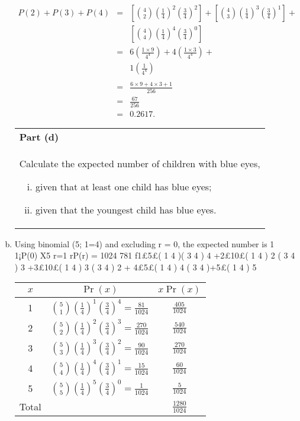 \documentclass[a4paper,12pt]{article}
\begin{document}
\begin{enumerate}[(a)]
\begin{eqnarray*} 
P(2)+P(3)+P(4) &=& 
\left[ { 4 \choose 2}
\left( \frac{1}{4} \right) ^2 \left(\frac{3}{4}\right)^2 \right]+ 
\left[ { 4 \choose 3}
\left( \frac{1}{4} \right) ^3  \left(\frac{3}{4}\right)^1 \right]
+ \\
& & \left[ { 4 \choose 4}
\left( \frac{1}{4} \right) ^4  \left(\frac{3}{4}\right)^{0} \right]
\\ &=& 6 \left(\frac{1 \times 9}{4^4}\right) + 4 \left(\frac{1 \times 3}{4^4}\right)+ \\ & &  1 \left(\frac{1}{4^4}\right)\\
\\ &=&  \frac{6\times 9+4 \times 3+1}{256}    \\
 &=& \frac{67}{256} \\
 &=& 0.2617.
\end{eqnarray*}
\newpage
  \begin{table}[ht!]
     \centering
     \begin{tabular}{|p{15cm}|}
     \hline  \large
\noindent \textbf{Part (d)}\\ \large  Calculate the expected number of children with blue eyes,
\begin{enumerate}[(i)]
\item given that at least one child has blue eyes;
\item given that the youngest child has blue eyes.
\end{enumerate}
\\ \hline
      \end{tabular}
    \end{table}
\item  Using binomial (5; 1=4) and excluding r = 0, the expected number is
1
1¡P(0)
X5
r=1
rP(r) =
1024
781
f1£5£(
1
4
)(
3
4
)
4
+2£10£(
1
4
)
2
(
3
4
)
3
+3£10£(
1
4
)
3
(
3
4
)
2
+
4£5£(
1
4
)
4
(
3
4
)+5£(
1
4
)
5
{
\large
\begin{center}
\begin{tabular}{|c|c|c|} \hline
$x$ & $\Pr(x)$ & $x \Pr(x)$\\ \hline
1&  $ {5 \choose 1}  \left( \frac{1}{4} \right) ^1  \left(\frac{3}{4}\right)^{4} = \frac{81}{1024}$&  $\frac{405}{1024}$ \\\hline
2&  ${5 \choose 2}\left( \frac{1}{4} \right) ^2  \left(\frac{3}{4}\right)^{3} = \frac{270}{1024}$&  $\frac{540}{1024}$ \\\hline
3&  ${5 \choose 3}\left( \frac{1}{4} \right) ^3  \left(\frac{3}{4}\right)^{2} = \frac{90}{1024}$&  $\frac{270}{1024}$ \\\hline
4&  ${5 \choose 4}\left( \frac{1}{4} \right) ^4  \left(\frac{3}{4}\right)^{1}= \frac{15}{1024}$&  $\frac{60}{1024}$\\ \hline
5& ${5 \choose 5}\left( \frac{1}{4} \right) ^5  \left(\frac{3}{4}\right)^{0} = \frac{1}{1024}$&  $\frac{5}{1024}$ \\\hline
Total & & $\frac{1280}{1024}$\\ \hline
\end{tabular}
\end{center}
}


\end{enumerate}
\end{document}

